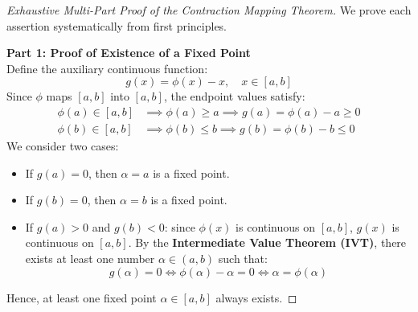\begin{proof}[Exhaustive Multi-Part Proof of the Contraction Mapping Theorem]
We prove each assertion systematically from first principles.

\medskip
\noindent\textbf{Part 1: Proof of Existence of a Fixed Point} \\
Define the auxiliary continuous function:
\begin{equation}
    g(x) = \phi(x) - x, \quad x \in [a, b]
\end{equation}
Since $\phi$ maps $[a, b]$ into $[a, b]$, the endpoint values satisfy:
\begin{align}
    \phi(a) \in [a, b] &\implies \phi(a) \ge a \implies g(a) = \phi(a) - a \ge 0 \\
    \phi(b) \in [a, b] &\implies \phi(b) \le b \implies g(b) = \phi(b) - b \le 0
\end{align}
We consider two cases:
\begin{itemize}
    \item If $g(a) = 0$, then $\alpha = a$ is a fixed point.
    \item If $g(b) = 0$, then $\alpha = b$ is a fixed point.
    \item If $g(a) > 0$ and $g(b) < 0$: since $\phi(x)$ is continuous on $[a, b]$, $g(x)$ is continuous on $[a, b]$. By the \textbf{Intermediate Value Theorem (IVT)}, there exists at least one number $\alpha \in (a, b)$ such that:
    \begin{equation}
        g(\alpha) = 0 \iff \phi(\alpha) - \alpha = 0 \iff \boxed{\alpha = \phi(\alpha)}
    \end{equation}
\end{itemize}
Hence, at least one fixed point $\alpha \in [a, b]$ always exists.


\end{proof}
